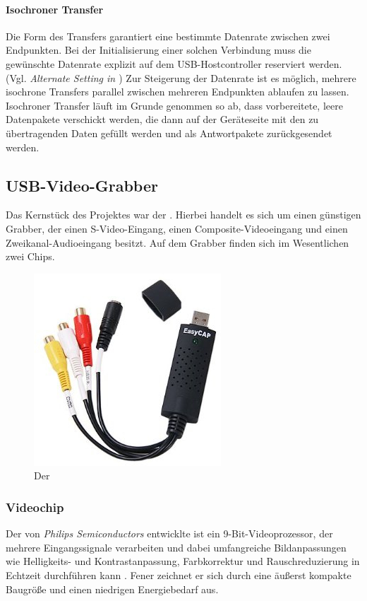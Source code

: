 \paragraph{Isochroner Transfer}
Die Form des Transfers garantiert eine bestimmte Datenrate zwischen zwei Endpunkten.
Bei der Initialisierung einer solchen Verbindung muss die gewünschte Datenrate explizit auf dem USB-Hostcontroller reserviert werden. (Vgl. \emph{Alternate Setting in \autocite{standard:usb2}})
Zur Steigerung der Datenrate ist es möglich, mehrere isochrone Transfers parallel zwischen mehreren Endpunkten ablaufen zu lassen.
Isochroner Transfer läuft im Grunde genommen so ab, dass vorbereitete, leere Datenpakete verschickt werden, die dann auf der Geräteseite mit den zu übertragenden Daten gefüllt werden und als Antwortpakete zurückgesendet werden.

\subsection{USB-Video-Grabber}
Das Kernstück des Projektes war der \easycap{}.
Hierbei handelt es sich um einen günstigen Grabber, der einen S-Video-Eingang, einen Composite-Videoeingang und einen Zweikanal-Audioeingang besitzt.
Auf dem Grabber finden sich im Wesentlichen zwei Chips.
\begin{figure}[h]
 \centering
 \includegraphics[width=.5\textwidth]{grabber}
 \caption{Der \easycap{}}
\end{figure}

\subsubsection{Videochip \saa}
Der von \emph{Philips Semiconductors} entwicklte \saa{} ist ein 9-Bit-Videoprozessor, der mehrere Eingangssignale verarbeiten und dabei umfangreiche Bildanpassungen wie Helligkeits- und Kontrastanpassung, Farbkorrektur und Rauschreduzierung in Echtzeit durchführen kann \autocite{datasheet:saa7113}.
Fener zeichnet er sich durch eine äußerst kompakte Baugröße und einen niedrigen Energiebedarf aus.

